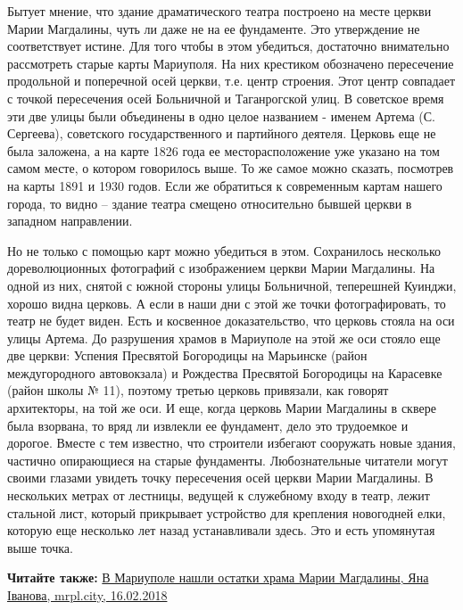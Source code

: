 Бытует мнение, что здание драматического театра построено на месте церкви Марии
Магдалины, чуть ли даже не на ее фундаменте. Это утверждение не соответствует
истине. Для того чтобы в этом убедиться, достаточно внимательно рассмотреть
старые карты Мариуполя. На них крестиком обозначено пересечение продольной и
поперечной осей церкви, т.е. центр строения. Этот центр совпадает с точкой
пересечения осей Больничной и Таганрогской улиц. В советское время эти две
улицы были объединены в одно целое названием - именем Артема (С. Сергеева),
советского государственного и партийного деятеля. Церковь еще не была заложена,
а на карте 1826 года ее месторасположение уже указано на том самом месте, о
котором говорилось выше. То же самое можно сказать, посмотрев на карты 1891 и
1930 годов. Если же обратиться к современным картам нашего города, то видно –
здание театра смещено относительно бывшей церкви в западном направлении.


Но не только с помощью карт можно убедиться в этом. Сохранилось несколько
дореволюционных фотографий с изображением церкви Марии Магдалины. На одной из
них, снятой с южной стороны улицы Больничной, теперешней Куинджи, хорошо видна
церковь. А если в наши дни с этой же точки фотографировать, то театр не будет
виден. Есть и косвенное доказательство, что церковь стояла на оси улицы Артема.
До разрушения храмов в Мариуполе на этой же оси стояло еще две церкви: Успения
Пресвятой Богородицы на Марьинске (район междугородного автовокзала) и
Рождества Пресвятой Богородицы на Карасевке (район школы № 11), поэтому третью
церковь привязали, как говорят архитекторы, на той же оси. И еще, когда церковь
Марии Магдалины в сквере была взорвана, то вряд ли извлекли ее фундамент, дело
это трудоемкое и дорогое. Вместе с тем известно, что строители избегают
сооружать новые здания, частично опирающиеся на старые фундаменты.
Любознательные читатели могут своими глазами увидеть точку пересечения осей
церкви Марии Магдалины. В нескольких метрах от лестницы, ведущей к служебному
входу в театр, лежит стальной лист, который прикрывает устройство для крепления
новогодней елки, которую еще несколько лет назад устанавливали здесь. Это и
есть упомянутая выше точка.

\textbf{Читайте также:} \href{https://mrpl.city/news/view/mariupol-k-240-letiyu-napolnyat-installyatsiyami-v-ramkah-proekta-gorod-marii-video}{%
В Мариуполе нашли остатки храма Марии Магдалины, Яна Іванова, mrpl.city, 16.02.2018}

